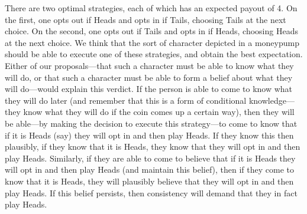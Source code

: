 \documentclass[11pt]{article}
\theoremstyle{definition}
\theoremstyle{definition}
\begin{document}
There are two optimal strategies, each of which has an expected payout of 4. On the first, one opts out if Heads and opts in if Tails, choosing Tails at the next choice. On the second, one opts out if Tails and opts in if Heads, choosing Heads at the next choice. We think that the sort of character depicted in a moneypump should be able to execute one of these strategies, and obtain the best expectation. Either of our proposals---that such a character must be able to know what they will do, or that such a character must be able to form a belief about what they will do---would explain this verdict. If the person is able to come to know what they will do later (and remember that this is a form of conditional knowledge---they know what they will do if the coin comes up a certain way), then they will be able---by making the decision to execute this strategy---to come to know that if it is Heads (say) they will opt in and then play Heads. If they know this then plausibly, if they know that it is Heads, they know that they will opt in and then play Heads. Similarly, if they are able to come to believe that if it is Heads they will opt in and then play Heads (and maintain this belief), then if they come to know that it is Heads, they will plausibly believe that they will opt in and then play Heads. If this belief persists, then consistency will demand that they in fact play Heads.%
\end{document}
